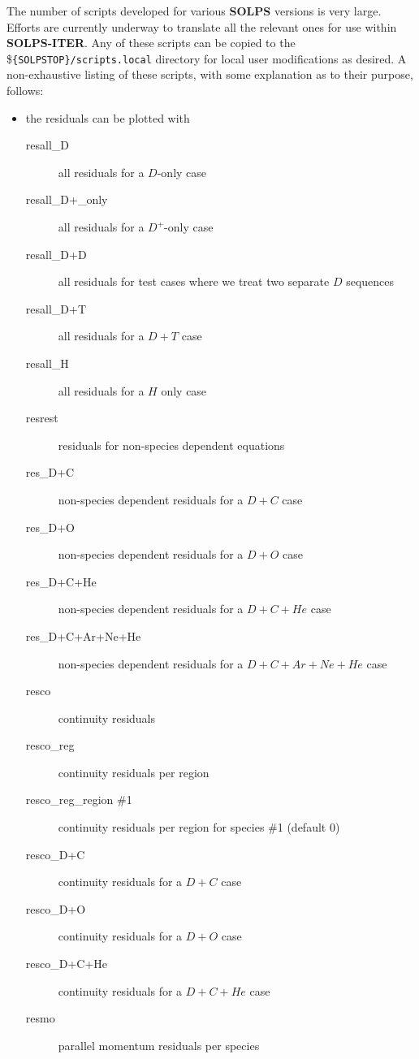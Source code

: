 \documentclass[a4paper,10pt]{report}
\newcommand\SOLPSITERns{{\bf SOLPS-ITER}}
\begin{document}
The number of scripts developed for various {\bf SOLPS} versions is very large. Efforts are currently underway to translate all the relevant ones for use within \SOLPSITERns. Any of these scripts can be copied to the \${\tt \{SOLPSTOP\}/scripts.local} directory for local user modifications as desired. A non-exhaustive listing of these scripts, with some explanation as to their purpose, follows:
\begin{itemize}
\item the residuals can be plotted with
  \begin{description}
  \item[resall\_D] all residuals for a $D$-only case
  \item[resall\_D+\_only] all residuals for a $D^+$-only case
  \item[resall\_D+D] all residuals for test cases where we treat two separate $D$ sequences
  \item[resall\_D+T] all residuals for a $D+T$ case
  \item[resall\_H] all residuals for a $H$ only case
  \item[resrest] residuals for non-species dependent equations
  \item[res\_D+C] non-species dependent residuals for a $D+C$ case
  \item[res\_D+O]  non-species dependent residuals for a $D+O$ case
  \item[res\_D+C+He] non-species dependent residuals for a $D+C+He$ case
  \item[res\_D+C+Ar+Ne+He] non-species dependent residuals for a $D+C+Ar+Ne+He$ case
  \item[resco] continuity residuals
  \item[resco\_reg] continuity residuals per region
  \item[resco\_reg\_region \#1] continuity residuals per region for species \#1 (default 0)
  \item[resco\_D+C] continuity residuals for a $D+C$ case
  \item[resco\_D+O] continuity residuals for a $D+O$ case
  \item[resco\_D+C+He] continuity residuals for a $D+C+He$ case
  \item[resmo] parallel momentum residuals per species

\end{description}
\end{itemize}
\end{document}
